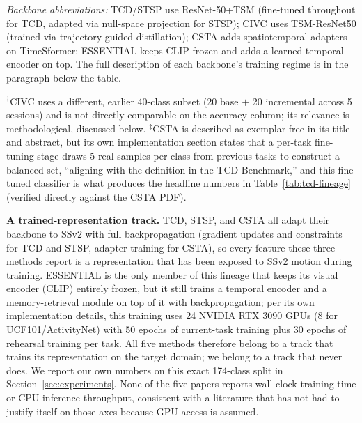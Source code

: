 \documentclass[11pt]{article}
\begin{document}
\noindent\textit{Backbone abbreviations:} TCD/STSP use ResNet-50+TSM
(fine-tuned throughout for TCD, adapted via null-space projection for
STSP); CIVC uses TSM-ResNet50 (trained via trajectory-guided distillation);
CSTA adds spatiotemporal adapters on TimeSformer; ESSENTIAL keeps CLIP
frozen and adds a learned temporal encoder on top. The full description of
each backbone's training regime is in the paragraph below the table.

$^\dagger$CIVC uses a different, earlier 40-class subset (20 base $+$ 20
incremental across 5 sessions) and is not directly comparable on the
accuracy column; its relevance is methodological, discussed below.
$^\ddagger$CSTA is described as exemplar-free in its title and abstract, but
its own implementation section states that a per-task fine-tuning stage
draws 5 real samples per class from previous tasks to construct a balanced
set, ``aligning with the definition in the TCD Benchmark,'' and this
fine-tuned classifier is what produces the headline numbers in
Table~\ref{tab:tcd-lineage} (verified directly against the CSTA PDF).

\textbf{A trained-representation track.} TCD, STSP, and CSTA all adapt their backbone to SSv2 with full
backpropagation (gradient updates and constraints for TCD and STSP, adapter
training for CSTA), so every feature these three methods report is a
representation that has been exposed to SSv2 motion during training.
ESSENTIAL is the only member of this lineage that keeps its visual encoder
(CLIP) entirely frozen, but it still trains a temporal encoder and a
memory-retrieval module on top of it with backpropagation; per its own
implementation details, this training uses 24 NVIDIA RTX 3090 GPUs (8 for
UCF101/ActivityNet) with 50 epochs of current-task training plus 30 epochs
of rehearsal training per task. All five methods therefore belong to a track
that trains its representation on the target domain; we belong to a track
that never does. We report our own numbers on this exact 174-class split in
Section~\ref{sec:experiments}. None of the five papers reports wall-clock training time
or CPU inference throughput, consistent with a literature that has not had
to justify itself on those axes because GPU access is assumed.
\end{document}
